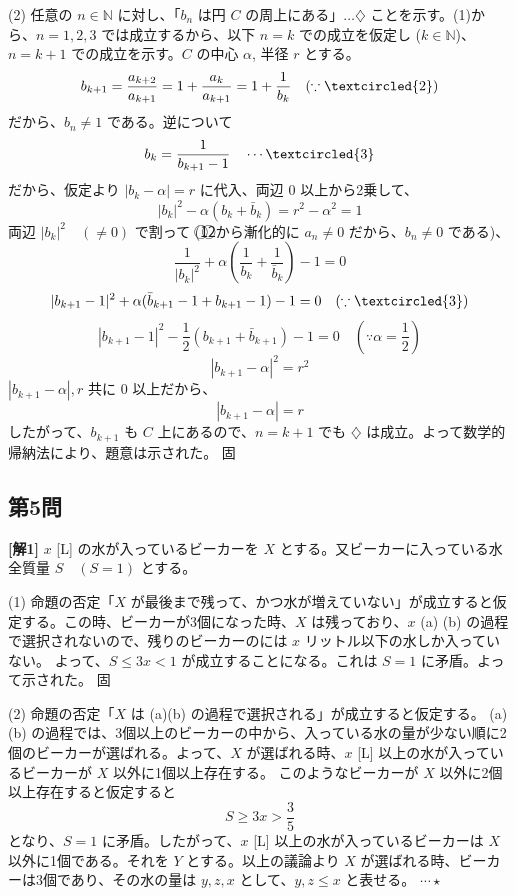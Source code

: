 \documentclass[../main.tex]{subfiles}
\begin{document}
\noindent
(2) 任意の $n \in \mathbb{N}$ に対し、「$b_n$ は円 $C$ の周上にある」$\dots \diamondsuit$ ことを示す。(1)から、$n=1,2,3$ では成立するから、以下 $n=k$ での成立を仮定し ($k \in \mathbb{N}$)、$n=k+1$ での成立を示す。$C$ の中心 $\alpha$, 半径 $r$ とする。
\[
  b_{k+1} = \frac{a_{k+2}}{a_{k+1}} = 1 + \frac{a_k}{a_{k+1}} = 1 + \frac{1}{b_k} \quad (\because \textcircled{2})
\]
だから、$b_n \neq 1$ である。逆について
\[
  b_k = \frac{1}{b_{k+1}-1} \quad \cdots \textcircled{3}
\]
だから、仮定より $|b_k - \alpha| = r$ に代入、両辺 $0$ 以上から2乗して、
\[
  |b_k|^2 - \alpha(b_k + \bar{b}_k) = r^2 - \alpha^2 = 1
\]
両辺 $|b_k|^2 \quad (\neq 0)$ で割って (\textcircled{1}\textcircled{2}から漸化的に $a_n \neq 0$ だから、$b_n \neq 0$ である)、
\[
  \frac{1}{|b_k|^2} + \alpha \left( \frac{1}{b_k} + \frac{1}{\bar{b}_k} \right) - 1 = 0
\]
\[
  |b_{k+1}-1|^2 + \alpha( \bar{b}_{k+1}-1 + b_{k+1}-1 ) - 1 = 0 \quad (\because \textcircled{3})
\]
\[
  |b_{k+1}-1|^2 - \frac{1}{2} ( b_{k+1} + \bar{b}_{k+1} ) - 1 = 0 \quad \left(\because \alpha = \frac{1}{2}\right)
\]
\[
  |b_{k+1} - \alpha|^2 = r^2
\]
$|b_{k+1} - \alpha|, r$ 共に $0$ 以上だから、
\[
  |b_{k+1} - \alpha| = r
\]
したがって、$b_{k+1}$ も $C$ 上にあるので、$n=k+1$ でも $\diamondsuit$ は成立。よって数学的帰納法により、題意は示された。 \hfill $\text{固}$

\bigskip

\subsection*{第5問}

\noindent
\textbf{[解1]} $x$ [L] の水が入っているビーカーを $X$ とする。又ビーカーに入っている水全質量 $S \quad (S=1)$ とする。

\medskip

\noindent
(1) 命題の否定「$X$ が最後まで残って、かつ水が増えていない」が成立すると仮定する。この時、ビーカーが3個になった時、$X$ は残っており、$x$ (a) (b) の過程で選択されないので、残りのビーカーのには $x$ リットル以下の水しか入っていない。
よって、$S \le 3x < 1$ が成立することになる。これは $S=1$ に矛盾。よって示された。 \hfill $\text{固}$

\medskip

\noindent
(2) 命題の否定「$X$ は (a)(b) の過程で選択される」が成立すると仮定する。
(a)(b) の過程では、3個以上のビーカーの中から、入っている水の量が少ない順に2個のビーカーが選ばれる。よって、$X$ が選ばれる時、$x$ [L] 以上の水が入っているビーカーが $X$ 以外に1個以上存在する。
このようなビーカーが $X$ 以外に2個以上存在すると仮定すると
\[
  S \ge 3x > \frac{3}{5}
\]
となり、$S=1$ に矛盾。したがって、$x$ [L] 以上の水が入っているビーカーは $X$ 以外に1個である。それを $Y$ とする。以上の議論より $X$ が選ばれる時、ビーカーは3個であり、その水の量は $y, z, x$ として、$y, z \le x$ と表せる。 $\cdots \star$
\end{document}
